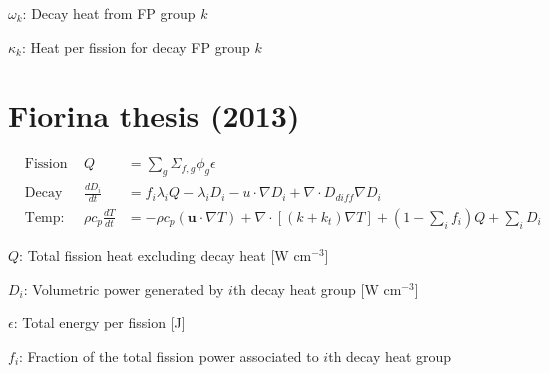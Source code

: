 \documentclass[letterpaper,11pt]{article}
\begin{document}
$\omega_k$: Decay heat from FP group $k$

$\kappa_k$: Heat per fission for decay FP group $k$

%
%
%
%
%
%


\section*{Fiorina thesis (2013)}
%
\begin{align}
&\text{Fission power density:} & Q &= \sum_g \Sigma_{f,g} \phi_g \epsilon & \\
&\text{Decay heat density:} & \frac{d D_i}{dt} &= f_i \lambda_i Q - \lambda_i D_i
- u \cdot\nabla D_i + \nabla \cdot D_{diff} \nabla D_i & \label{eq:7} \\
&\text{Temp:} & \rho c_p \frac{dT}{dt} &= - \rho c_p (\boldsymbol{u} \cdot \nabla T) + \nabla \cdot [(k + k_t) \nabla T] + (1 - \sum_i f_i) Q + \sum_i D_i &
\end{align}

$Q$: Total fission heat excluding decay heat [W cm$^{-3}$]

$D_i$: Volumetric power generated by $i$th decay heat group [W cm$^{-3}$]

$\epsilon$: Total energy per fission [J]

$f_i$: Fraction of the total fission power associated to $i$th decay heat group
\end{document}
